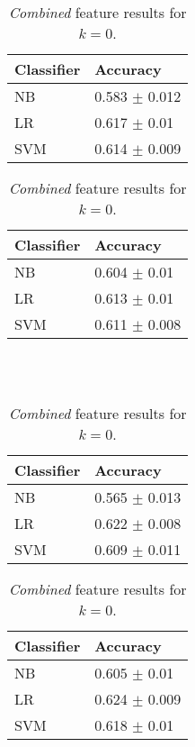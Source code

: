 \begin{table}[h]
\begin{minipage}[b]{.50\textwidth}
\centering
  \begin{tabular}{|l|l|} %
  \hline
  		\textbf{Classifier} & \textbf{Accuracy} \\ \hline
		NB & 0.583 $\pm$ 0.012 \\ \hline
		LR & 0.617 $\pm$ 0.01 \\ \hline
		SVM & 0.614 $\pm$ 0.009 \\ \hline
  \end{tabular}
  \caption{\emph{Favourite} feature results for $k=0$.}
\end{minipage}
\begin{minipage}[b]{.50\textwidth}
\centering
  \begin{tabular}{|l|l|} %
  \hline
  		\textbf{Classifier} & \textbf{Accuracy} \\ \hline
		NB & 0.604 $\pm$ 0.01 \\ \hline
		LR & 0.613 $\pm$ 0.01 \\ \hline
		SVM & 0.611 $\pm$ 0.008 \\ \hline
  \end{tabular}
  \caption{\emph{Pages} feature results for $k=0$.}
\end{minipage}
\\
\\
\begin{minipage}[b]{.50\textwidth}
\centering
  \begin{tabular}{|l|l|} %
  \hline
  		\textbf{Classifier} & \textbf{Accuracy} \\ \hline
		NB & 0.565 $\pm$ 0.013 \\ \hline
		LR & 0.622 $\pm$ 0.008 \\ \hline
		SVM & 0.609 $\pm$ 0.011 \\ \hline
  \end{tabular}
  \caption{\emph{Groups} feature results for $k=0$.}
\end{minipage}
\begin{minipage}[b]{.50\textwidth}
\centering
  \begin{tabular}{|l|l|} %
  \hline
  		\textbf{Classifier} & \textbf{Accuracy} \\ \hline
		NB & 0.605 $\pm$ 0.01 \\ \hline
		LR & 0.624 $\pm$ 0.009 \\ \hline
		SVM & 0.618 $\pm$ 0.01 \\ \hline
  \end{tabular}
  \caption{\emph{Combined} feature results for $k=0$.}
\end{minipage}
\end{table}

